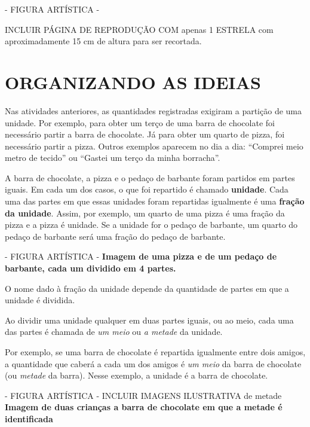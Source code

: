 \documentclass[a4,12pt]{book}
\begin{document}
\begin{imagem*}[breakable]{}{}   - FIGURA ARTÍSTICA -  
  \begin{nota*}[breakable]{}{}         
    INCLUIR PÁGINA DE REPRODUÇÃO COM apenas 1 ESTRELA com aproximadamente 15 cm de altura para ser recortada.    
  \end{nota*}  
\end{imagem*}

\section*{ORGANIZANDO AS IDEIAS }

Nas atividades anteriores, as quantidades registradas exigiram a partição de uma unidade. Por exemplo, para obter um terço de uma barra de chocolate foi necessário partir a barra de chocolate. Já para obter um quarto de pizza, foi necessário partir a pizza. Outros exemplos aparecem no dia a dia: ``Comprei meio metro de tecido'' ou ``Gastei um terço da minha borracha''.

A barra de chocolate, a pizza e o pedaço de barbante foram partidos em partes iguais. 
Em cada um dos casos, o que foi repartido é chamado {\bf unidade}. Cada uma das partes em que essas unidades foram repartidas igualmente é uma {\bf fração da unidade}. Assim, por exemplo, um quarto de uma pizza é uma fração da pizza e a pizza é unidade. Se a unidade for o pedaço de barbante, um quarto do pedaço de barbante será uma fração do pedaço de barbante.

\begin{imagem*}[breakable]{}{}   - FIGURA ARTÍSTICA -  
  {\bf Imagem de uma pizza e de um pedaço de barbante, cada um dividido em 4 partes.}  
\end{imagem*}

O nome dado à fração da unidade depende da quantidade de partes em que a unidade é dividida. 

Ao dividir uma unidade qualquer em duas partes iguais, ou ao meio, cada uma das partes é chamada de {\it um meio} ou {\it a metade} da unidade. 

Por exemplo, se uma barra de chocolate é repartida igualmente entre dois amigos, a quantidade que caberá a cada um dos amigos é {\it um meio} da barra de chocolate (ou {\it metade} da barra). Nesse exemplo, a unidade é a barra de chocolate.

\begin{imagem*}[breakable]{}{}   - FIGURA ARTÍSTICA - INCLUIR IMAGENS ILUSTRATIVA de metade   
  {\bf Imagem de duas crianças a barra de chocolate em que a metade é identificada}  
\end{imagem*}
\end{document}

